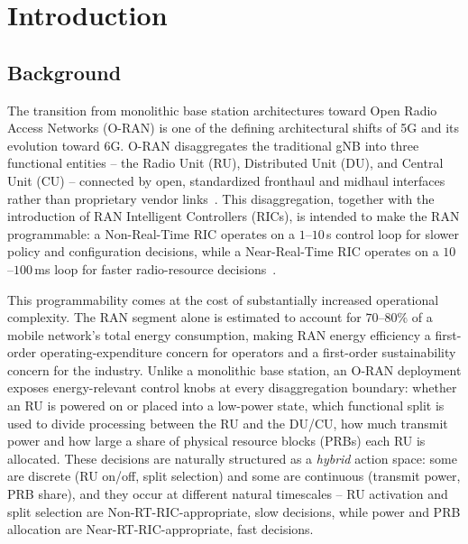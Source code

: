 %
%

\chapter{Introduction}
\label{chap:oran-introduction}

\section{Background}
\label{sec:oran-background}

The transition from monolithic base station architectures toward Open Radio
Access Networks (O-RAN) is one of the defining architectural shifts of 5G
and its evolution toward 6G. O-RAN disaggregates the traditional gNB into
three functional entities -- the Radio Unit (RU), Distributed Unit (DU), and
Central Unit (CU) -- connected by open, standardized fronthaul and midhaul
interfaces rather than proprietary vendor links~\cite{oran2021mvp}. This
disaggregation, together with the introduction of RAN Intelligent
Controllers (RICs), is intended to make the RAN programmable: a Non-Real-Time
RIC operates on a $1$--$10$\,s control loop for slower policy and
configuration decisions, while a Near-Real-Time RIC operates on a
$10$--$100$\,ms loop for faster radio-resource decisions~\cite{oran2021mvp}.

This programmability comes at the cost of substantially increased
operational complexity. The RAN segment alone is estimated to account for
$70$--$80\%$ of a mobile network's total energy consumption, making RAN
energy efficiency a first-order operating-expenditure concern for operators
and a first-order sustainability concern for the industry. Unlike a
monolithic base station, an O-RAN deployment exposes energy-relevant control
knobs at every disaggregation boundary: whether an RU is powered on or
placed into a low-power state, which functional split is used to divide
processing between the RU and the DU/CU, how much transmit power and how
large a share of physical resource blocks (PRBs) each RU is allocated. These
decisions are naturally structured as a \emph{hybrid} action space: some are
discrete (RU on/off, split selection) and some are continuous (transmit
power, PRB share), and they occur at different natural timescales -- RU
activation and split selection are Non-RT-RIC-appropriate, slow decisions,
while power and PRB allocation are Near-RT-RIC-appropriate, fast decisions.

